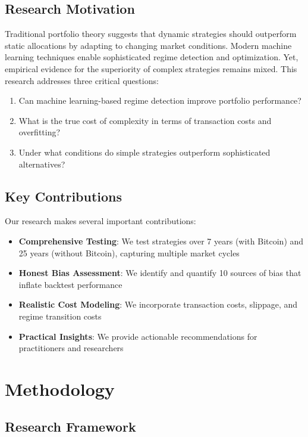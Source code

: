 \documentclass[twocolumn,ieee]{arithmaxresearch}
\begin{document}
\subsection{Research Motivation}

Traditional portfolio theory suggests that dynamic strategies should outperform static allocations by adapting to changing market conditions. Modern machine learning techniques enable sophisticated regime detection and optimization. Yet, empirical evidence for the superiority of complex strategies remains mixed. This research addresses three critical questions:

\begin{enumerate}
    \item Can machine learning-based regime detection improve portfolio performance?
    \item What is the true cost of complexity in terms of transaction costs and overfitting?
    \item Under what conditions do simple strategies outperform sophisticated alternatives?
\end{enumerate}

\subsection{Key Contributions}

Our research makes several important contributions:

\begin{itemize}
    \item \textbf{Comprehensive Testing}: We test strategies over 7 years (with Bitcoin) and 25 years (without Bitcoin), capturing multiple market cycles
    \item \textbf{Honest Bias Assessment}: We identify and quantify 10 sources of bias that inflate backtest performance
    \item \textbf{Realistic Cost Modeling}: We incorporate transaction costs, slippage, and regime transition costs
    \item \textbf{Practical Insights}: We provide actionable recommendations for practitioners and researchers
\end{itemize}

\section{Methodology}

\subsection{Research Framework}
\end{document}
